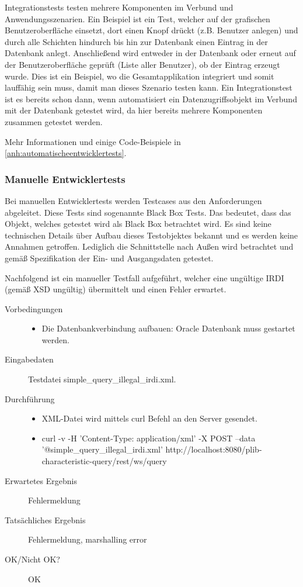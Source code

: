 \glspl{Integrationstest} testen mehrere Komponenten im Verbund und Anwendungsszenarien. Ein Beispiel ist ein Test, welcher auf der grafischen Benutzeroberfläche einsetzt, dort einen Knopf drückt (z.B. Benutzer anlegen) und durch alle Schichten hindurch bis hin zur Datenbank einen Eintrag in der Datenbank anlegt. Anschließend wird entweder in der Datenbank oder erneut auf der Benutzeroberfläche geprüft (Liste aller Benutzer), ob der Eintrag erzeugt wurde. 
Dies ist ein Beispiel, wo die Gesamtapplikation integriert und somit lauffähig sein muss, damit man dieses Szenario testen kann. 
Ein Integrationstest ist es bereits schon dann, wenn automatisiert ein Datenzugriffsobjekt im Verbund mit der Datenbank getestet wird, da hier bereits mehrere Komponenten zusammen getestet werden. 

Mehr Informationen und einige Code-Beispiele in \autoref{anh:automatischeentwicklertests}.

\subsubsection{Manuelle Entwicklertests}

Bei manuellen Entwicklertests werden Testcases aus den Anforderungen abgeleitet. Diese Tests sind sogenannte Black Box Tests. Das bedeutet, dass das Objekt, welches getestet wird als Black Box betrachtet wird. Es sind keine technischen Details über Aufbau dieses Testobjektes bekannt und es werden keine Annahmen getroffen. Lediglich die Schnittstelle nach Außen wird betrachtet und gemäß Spezifikation der Ein- und Ausgangsdaten getestet. 

Nachfolgend ist ein manueller Testfall aufgeführt, welcher eine ungültige IRDI (gemäß XSD ungültig) übermittelt und einen Fehler erwartet. 

\begin{description}
\item[Vorbedingungen] 
  \begin{itemize}
   \item Die Datenbankverbindung aufbauen: Oracle Datenbank muss gestartet werden.
  \end{itemize}
\item[Eingabedaten] Testdatei simple\_query\_illegal\_irdi.xml. 
\item[Durchführung]
   \begin{itemize}
   \item XML-Datei wird mittels curl Befehl an den Server gesendet.
   \item curl -v -H 'Content-Type: application/xml' -X POST --data '@simple\_query\_illegal\_irdi.xml' http://localhost:8080/plib-characteristic-query/rest/ws/query
  \end{itemize}
\item[Erwartetes Ergebnis] Fehlermeldung
\item[Tatsächliches Ergebnis] Fehlermeldung, marshalling error
\item[OK/Nicht OK?] OK
\end{description}

